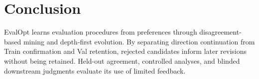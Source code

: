 \section{Conclusion}
\label{sec:conclusion}

EvalOpt learns evaluation procedures from preferences through disagreement-based mining and depth-first evolution.
By separating direction continuation from Train confirmation and Val retention, rejected candidates inform later revisions without being retained.
Held-out agreement, controlled analyses, and blinded downstream judgments evaluate its use of limited feedback.
